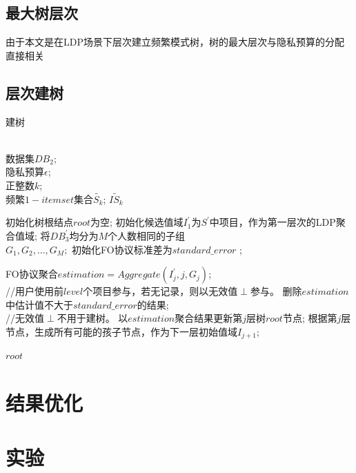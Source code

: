 \documentclass[UTF8]{ctexart}
\begin{document}






\subsection{最大树层次}
\label{section:MaxIter}
由于本文是在LDP场景下层次建立频繁模式树，树的最大层次与隐私预算的分配直接相关

\subsection{层次建树}
\label{section:buildTree}

\begin{algorithm}[htbp]
\caption{建树}
\label{alg:bulid tree}
\begin{algorithmic}[1]
\REQUIRE ~~\\
数据集$DB_2$;\\
隐私预算$\epsilon$;\\
正整数$k$;\\
频繁$1-itemset$集合$\tilde{S_k}$;
\ENSURE $\tilde{IS_k}$

\STATE 初始化树根结点$root$为空;
\STATE 初始化候选值域$I^{\prime}_{1}$为$S^{\prime}$中项目，作为第一层次的LDP聚合值域;
\STATE 将$D B^{\prime}_{3}$均分为$M$个人数相同的子组~~\\
$G_{1},G_{2},...,G_{M};$
\STATE 初始化FO协议标准差为$standard\_error$ ;

    \STATE FO协议聚合$estimation = Aggregate(I^{\prime}_{j},j,G_{j})$;\\
    //用户使用前$level$个项目参与，若无记录，则以无效值$\perp$参与。
    \STATE 删除$estimation$中估计值不大于$standard\_error$的结果;\\
    //无效值$\perp$不用于建树。
    \STATE 以$estimation$聚合结果更新第$j$层树$root$节点;
    \STATE 根据第$j$层节点，生成所有可能的孩子节点，作为下一层初始值域$I_{j+1}$;
\ENDFOR

\RETURN $root$
\end{algorithmic}
\end{algorithm}

\section{结果优化}
\label{section:optimize}

\section{实验}
\end{document}
